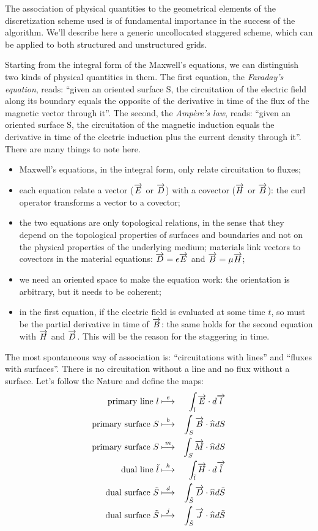 The association of physical quantities to the geometrical elements of
the discretization scheme used is of fundamental importance in the
success of the algorithm. We'll describe here a generic uncollocated
staggered scheme, which can be applied to both structured and
unstructured grids.

Starting from the integral form of the Maxwell's equations, we can
distinguish two kinds of physical quantities in them. The first
equation, the \emph{Faraday's equation}, reads: ``given an oriented
surface S, the circuitation of the electric field along its boundary
equals the opposite of the derivative in time of the flux of the
magnetic vector through it''. The second, the \emph{Amp\`ere's law},
reads: ``given an oriented surface S, the circuitation of the magnetic
induction equals the derivative in time of the electric induction plus
the current density through it''. There are many things to note here.
\begin{itemize}
\item
  Maxwell's equations, in the integral form, only relate circuitation
  to fluxes;
\item
  each equation relate a vector ($\overrightarrow{E}$ or $\overrightarrow{D}$) with a covector ($\overrightarrow{H}$
  or $\overrightarrow{B}$): the curl operator transforms a vector to a covector;
\item
  the two equations are only topological relations, in the sense that
  they depend on the topological properties of surfaces and boundaries
  and not on the physical properties of the underlying medium;
  materials link vectors to covectors in the material equations: $\overrightarrow{D} =
  \epsilon \overrightarrow{E}$ and $\overrightarrow{B} = \mu \overrightarrow{H}$;
\item
  we need an oriented space to make the equation work: the orientation
  is arbitrary, but it needs to be coherent;
\item
  in the first equation, if the electric field is evaluated at some
  time $t$, so must be the partial derivative in time of $\overrightarrow{B}$: the
  same holds for the second equation with $\overrightarrow{H}$ and $\overrightarrow{D}$. This will be
  the reason for the staggering in time.
\end{itemize}

The most spontaneous way of association is: ``circuitations with
lines'' and ``fluxes with surfaces''. There is no circuitation without
a line and no flux without a surface. Let's follow the Nature and
define the maps:
\begin{eqnarray} \label{eqn:dof}
  \mbox{primary line } l & \stackrel{e}{\longmapsto} &
  \int_{l}{{\overrightarrow{E} \cdot d\overrightarrow{l}}} \\
  \mbox{primary surface } S & \stackrel{b}{\longmapsto} &
  \int_{S}{{\overrightarrow{B} \cdot \widehat{n}}dS} \\
  \mbox{primary surface } S & \stackrel{m}{\longmapsto} &
  \int_{S}{{\overrightarrow{M} \cdot \widehat{n}}dS} \\
  \mbox{dual line } \tilde{l} & \stackrel{h}{\longmapsto} &
  \int_{\tilde{l}}{{\overrightarrow{H} \cdot d\overrightarrow{\tilde{l}}}} \\
  \mbox{dual surface } \tilde{S} & \stackrel{d}{\longmapsto} &
  \int_{\tilde{S}}{{\overrightarrow{D} \cdot \widehat{n}}d\tilde{S}} \\
  \mbox{dual surface } \tilde{S} & \stackrel{j}{\longmapsto} &
  \int_{\tilde{S}}{{\overrightarrow{J} \cdot \widehat{n}}d\tilde{S}}
\end{eqnarray}

